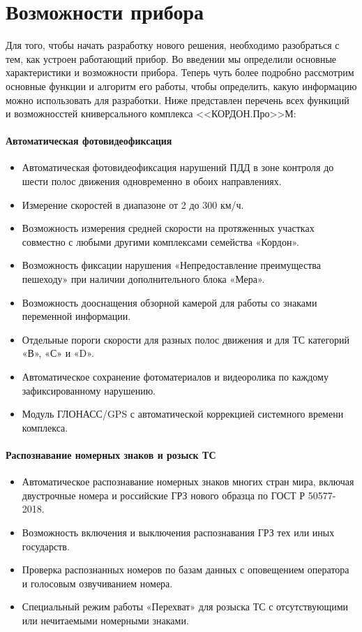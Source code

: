 \documentclass[specification,annotation,times]{itmo-student-thesis}
\begin{document}
	\section{Возможности прибора} \label{sec:cordon-charact}
	Для того, чтобы начать разработку нового решения, необходимо разобраться с тем, как устроен работающий прибор. Во введении мы определили основные характеристики и возможности прибора. Теперь чуть более подробно рассмотрим основные функции и алгоритм его работы, чтобы определить, какую информацию можно использовать для разработки. Ниже представлен перечень всех функиций и возможносстей книверсального комплекса <<КОРДОН.Про>>М:
	
	\paragraph{Автоматическая фотовидеофиксация}
	\begin{itemize}
		\item Автоматическая фотовидеофиксация нарушений ПДД в зоне контроля до шести полос движения  одновременно в обоих направлениях.
		\item Измерение скоростей в диапазоне от 2 до 300 км/ч.
		\item Возможность измерения средней скорости на протяженных участках совместно с любыми другими комплексами семейства «Кордон».
		\item Возможность фиксации нарушения «Непредоставление преимущества пешеходу» при наличии дополнительного блока «Мера».
		\item Возможность дооснащения обзорной камерой для работы со знаками переменной информации.
		\item Отдельные пороги скорости для разных полос движения и для ТС категорий «В», «С» и «D».
		\item Автоматическое сохранение фотоматериалов и видеоролика по каждому зафиксированному нарушению.
		\item Модуль ГЛОНАСС/GPS с автоматической коррекцией системного времени комплекса.
	\end{itemize}
	
	\paragraph{Распознавание номерных знаков и розыск ТС}
	\begin{itemize}
		\item Автоматическое распознавание номерных знаков многих стран мира, включая двустрочные номера и российские ГРЗ нового образца по ГОСТ Р 50577-2018.
		\item Возможность включения и выключения распознавания ГРЗ тех или иных государств.
		\item Проверка распознанных номеров по базам данных с оповещением оператора и голосовым озвучиванием номера.
		\item Специальный режим работы «Перехват» для розыска ТС с отсутствующими или нечитаемыми номерными знаками.
	\end{itemize}
	
\end{document}
